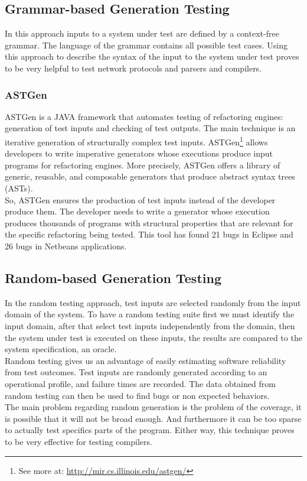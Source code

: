 \subsection{Grammar-based Generation Testing}
In this approach inputs to a system under test are defined by a context-free grammar. The language of the grammar contains all possible test cases.
Using this approach to describe the syntax of the input to the system under test proves to be very helpful to test
network protocols\cite{tal:syntax-based,kaksonen2001functional} and parsers and compilers\cite{1994-burgess,Burgess_Saidi_1996}.

\subsubsection{ASTGen}
ASTGen\cite{Daniel:2007:ATR:1287624.1287651} is a JAVA framework that automates testing of refactoring engines: generation of test inputs
and checking of test outputs. The main technique is an iterative generation of structurally complex test inputs.
ASTGen\footnote{See more at: \url{http://mir.cs.illinois.edu/astgen/}} allows developers to write imperative generators whose executions
produce input programs for refactoring engines. More precisely, ASTGen
offers a library of generic, reusable, and composable generators that produce abstract syntax trees (ASTs).\\
So, ASTGen ensures the production of test inputs instead of the developer produce them. The developer needs to write a generator whose execution
produces thousands of programs with structural properties that are relevant for the specific refactoring being tested. This tool has found
21 bugs in Eclipse and 26 bugs in Netbeans applications.

\subsection{Random-based Generation Testing}
In the random testing approach, test inputs are selected randomly from the input domain of the system.
To have a random testing suite first we must identify the input domain, after that select test inputs independently from the domain,
then the system under test is executed on these inputs, the results are compared to the system specification, an oracle.\\
Random testing gives us an advantage of easily estimating software reliability from test outcomes.
Test inputs are randomly generated according to an operational profile, and failure times are recorded.
The data obtained from random testing can then be used to find bugs or non expected behaviors.\\
\indent The main problem regarding random generation is the problem of the coverage, it is possible that it will not be broad enough. And furthermore it can be
too sparse to actually test specifics parts of the program. Either way, this technique proves to be very effective for testing compilers.

